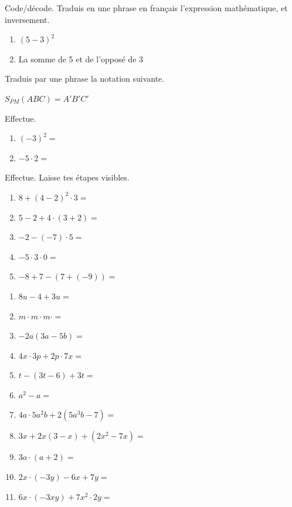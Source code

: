 \documentclass[parskip=half-,DIV=12,twoside=semi, 12pt]{scrartcl}
\newcounter{l}
\begin{document}
\begin{connaitre}[points=2]
    Code/décode. Traduis en une phrase en français l'expression mathématique, et inversement.
    \begin{enumerate}
        \item \((5-3)^2\)
        \item La somme de 5 et de l'opposé de 3
    \end{enumerate}
\end{connaitre}
\begin{connaitre}[points=1]
    Traduis par une phrase la notation suivante.

    \(S_{PM}(ABC) = A'B'C'\)
\end{connaitre}
\begin{appliquer}[points=2]
    Effectue.
    \begin{enumerate}
        \item \((-3)^2 =\)
        \item \(-5 \cdot 2 = \)
    \end{enumerate}
\end{appliquer}
\begin{appliquer}[points=5]
    Effectue. Laisse tes étapes visibles.
    \begin{enumerate}
        \item \(8+(4-2)^2\cdot 3=\)
        \item \(5-2+4\cdot (3+2)=\)
        \item \(-2-(-7)\cdot 5=\)
        \item \(-5\cdot 3\cdot 0=\)
        \item \(-8 + 7 -(7+(-9))=\)
    \end{enumerate}
\end{appliquer}
\begin{appliquer}[points=11]
    \begin{enumerate}
        \item \(8u-4+3u=\)
        \item \(m\cdot m \cdot m \cdot =\)
        \item \(-2a(3a-5b)=\)
        \item \(4x\cdot 3p + 2p \cdot 7x=\)
        \item \(t-(3t-6) + 3t=\)
        \item \(a^2 - a=\)
        \item \(4a\cdot 5a^2b + 2(5a^3b -7)=\)
        \item \(3x + 2x(3-x) + (2x^2-7x)=\)
        \item \(3a \cdot (a+2)=\)
        \item \(2x \cdot (-3y) - 6x + 7y=\)
        \item \(6x \cdot (-3xy) + 7x^2 \cdot 2y=\)
    \end{enumerate}
\end{appliquer}
\end{document}
